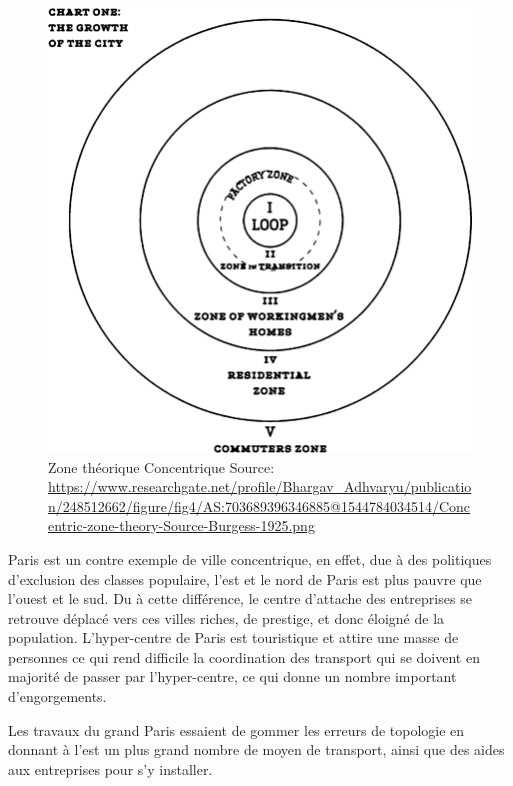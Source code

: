 \begin{figure}
    \centering
    \includegraphics[scale=0.30]{media/Concentric-zone-theory-Source-Burgess-1925.png}
    \caption{
    Zone théorique Concentrique\newline
        \tiny{Source:\newline
          \url{https://www.researchgate.net/profile/Bhargav_Adhvaryu/publication/248512662/figure/fig4/AS:703689396346885@1544784034514/Concentric-zone-theory-Source-Burgess-1925.png}
        }
    }
    \label{fig:concentric-zone-theory}
\end{figure}

Paris est un contre exemple de ville concentrique, en effet, due à des politiques d'exclusion des classes populaire,
l'est et le nord de Paris est plus pauvre que l'ouest et le sud.
Du à cette différence, le centre d'attache des entreprises se retrouve déplacé vers ces villes riches, de prestige,
et donc éloigné de la population.
L'hyper-centre de Paris est touristique et attire une masse de personnes ce qui rend difficile la coordination des
transport qui se doivent en majorité de passer par l'hyper-centre, ce qui donne un nombre important d'engorgements.

Les travaux du grand Paris essaient de gommer les erreurs de topologie en donnant à l'est un plus grand nombre de moyen de
transport, ainsi que des aides aux entreprises pour s'y installer.


